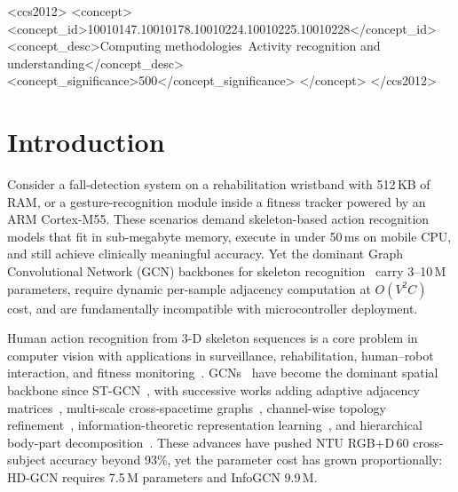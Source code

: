 \documentclass[sigconf,screen,review,anonymous]{acmart}
\begin{document}
\begin{CCSXML}
<ccs2012>
   <concept>
       <concept_id>10010147.10010178.10010224.10010225.10010228</concept_id>
       <concept_desc>Computing methodologies~Activity recognition and understanding</concept_desc>
       <concept_significance>500</concept_significance>
       </concept>
 </ccs2012>
\end{CCSXML}



\maketitle

\section{Introduction}\label{sec:intro}

Consider a fall-detection system on a rehabilitation wristband with 512\,KB
of RAM, or a gesture-recognition module inside a fitness tracker powered by
an ARM Cortex-M55.
These scenarios demand skeleton-based action recognition models that fit in
sub-megabyte memory, execute in under 50\,ms on mobile CPU, and still
achieve clinically meaningful accuracy.
Yet the dominant Graph Convolutional Network (GCN) backbones for skeleton
recognition~\cite{agcn,ctrgcn,infogcn,hdgcn} carry 3--10\,M parameters,
require dynamic per-sample adjacency computation at $O(V^2C)$ cost, and
are fundamentally incompatible with microcontroller deployment.

Human action recognition from 3-D skeleton sequences is a core problem
in computer vision with applications in surveillance, rehabilitation,
human--robot interaction, and fitness
monitoring~\cite{skeleton_survey,ntu60}.
GCNs~\cite{gcn_survey} have become the dominant spatial backbone since
ST-GCN~\cite{stgcn}, with successive works adding adaptive adjacency
matrices~\cite{agcn}, multi-scale cross-spacetime
graphs~\cite{msg3d}, channel-wise topology refinement~\cite{ctrgcn},
information-theoretic representation learning~\cite{infogcn}, and
hierarchical body-part decomposition~\cite{hdgcn}.
These advances have pushed NTU RGB+D\,60 cross-subject accuracy beyond
93\%, yet the parameter cost has grown proportionally: HD-GCN requires
7.5\,M parameters and InfoGCN 9.9\,M.
\end{document}

